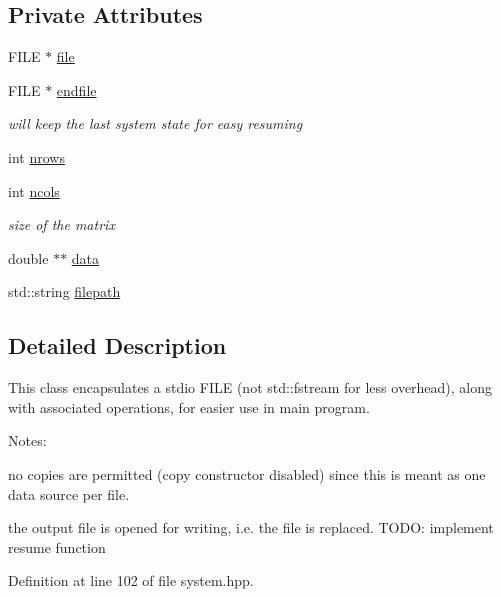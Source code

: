 \subsection*{Private Attributes}
\begin{DoxyCompactItemize}
\item 
F\-I\-L\-E $\ast$ \hyperlink{classdatafile_ae70cc0653ae8f036afaf64f30d9c88e7}{file}
\item 
F\-I\-L\-E $\ast$ \hyperlink{classdatafile_a45a1c9f31429aa1d8b54a02722095a1a}{endfile}
\begin{DoxyCompactList}\small\item\em will keep the last system state for easy resuming \end{DoxyCompactList}\item 
int \hyperlink{classdatafile_a7e9acc3d0f772c18910a6d86741ef4f5}{nrows}
\item 
int \hyperlink{classdatafile_a530295db9ac71c1417f1451ee3dcbf35}{ncols}
\begin{DoxyCompactList}\small\item\em size of the matrix \end{DoxyCompactList}\item 
double $\ast$$\ast$ \hyperlink{classdatafile_aa193a7b714962d635d40d1ed0b4daeee}{data}
\item 
std\-::string \hyperlink{classdatafile_af336f792f53618ff6d5f0dbe3d05e755}{filepath}
\end{DoxyCompactItemize}


\subsection{Detailed Description}
This class encapsulates a stdio F\-I\-L\-E (not std\-::fstream for less overhead), along with associated operations, for easier use in main program.

Notes\-:
\begin{DoxyEnumerate}
\item no copies are permitted (copy constructor disabled) since this is meant as one data source per file.
\item the output file is opened for writing, i.\-e. the file is replaced. T\-O\-D\-O\-: implement resume function 
\end{DoxyEnumerate}

Definition at line 102 of file system.\-hpp.



